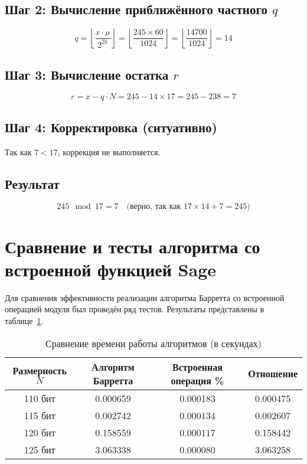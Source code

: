 \documentclass[12pt,a4paper]{article}
\begin{document}
\subsection{Шаг 2: Вычисление приближённого частного $q$}
\[
q = \left\lfloor \frac{x \cdot \mu}{2^{2k}} \right\rfloor = \left\lfloor \frac{245 \times 60}{1024} \right\rfloor = \left\lfloor \frac{14700}{1024} \right\rfloor = 14
\]

\subsection{Шаг 3: Вычисление остатка $r$}
\[
r = x - q \cdot N = 245 - 14 \times 17 = 245 - 238 = 7
\]

\subsection{Шаг 4: Корректировка (ситуативно)}
Так как $7 < 17$, коррекция не выполняется.

\subsection{Результат}
\[
245 \mod 17 = 7 \quad \text{(верно, так как $17 \times 14 + 7 = 245$)}
\]

\section{Сравнение и тесты алгоритма со встроенной функцией Sage}


Для сравнения эффективности реализации алгоритма Барретта со встроенной операцией модуля был проведён ряд тестов. Результаты представлены в таблице~\ref{tab:speed_comparison}.

\begin{table}[h]
\centering
\caption{Сравнение времени работы алгоритмов (в секундах)}
\label{tab:speed_comparison}
\begin{tabular}{|c|c|c|c|}
\hline
\textbf{Размерность $N$} & \textbf{Алгоритм Барретта} & \textbf{Встроенная операция \%} & \textbf{Отношение} \\
\hline
110 бит & 0.000659 & 0.000183 & 0.000475 \\
115 бит & 0.002742 & 0.000134 & 0.002607 \\
120 бит & 0.158559 & 0.000117 & 0.158442 \\
125 бит & 3.063338 & 0.000080 & 3.063258 \\
\hline
\end{tabular}
\end{table}
\end{document}
